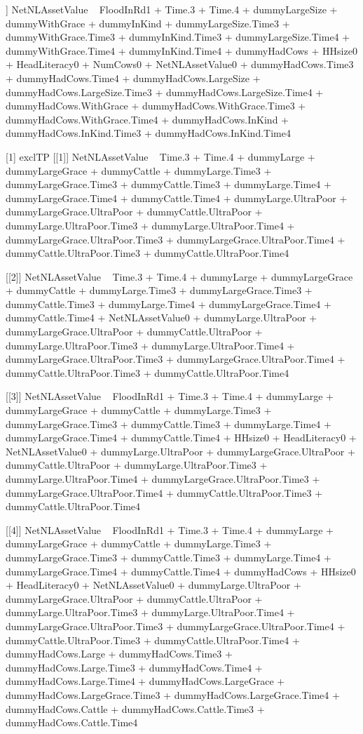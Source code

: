 \begin{Schunk}
\begin{Soutput}
[[6]]
NetNLAssetValue ~ FloodInRd1 + Time.3 + Time.4 + dummyLargeSize + 
    dummyWithGrace + dummyInKind + dummyLargeSize.Time3 + dummyWithGrace.Time3 + 
    dummyInKind.Time3 + dummyLargeSize.Time4 + dummyWithGrace.Time4 + 
    dummyInKind.Time4 + dummyHadCows + HHsize0 + HeadLiteracy0 + 
    NumCows0 + NetNLAssetValue0 + dummyHadCows.Time3 + dummyHadCows.Time4 + 
    dummyHadCows.LargeSize + dummyHadCows.LargeSize.Time3 + dummyHadCows.LargeSize.Time4 + 
    dummyHadCows.WithGrace + dummyHadCows.WithGrace.Time3 + dummyHadCows.WithGrace.Time4 + 
    dummyHadCows.InKind + dummyHadCows.InKind.Time3 + dummyHadCows.InKind.Time4

[1] exclTP
[[1]]
NetNLAssetValue ~ Time.3 + Time.4 + dummyLarge + dummyLargeGrace + 
    dummyCattle + dummyLarge.Time3 + dummyLargeGrace.Time3 + 
    dummyCattle.Time3 + dummyLarge.Time4 + dummyLargeGrace.Time4 + 
    dummyCattle.Time4 + dummyLarge.UltraPoor + dummyLargeGrace.UltraPoor + 
    dummyCattle.UltraPoor + dummyLarge.UltraPoor.Time3 + dummyLarge.UltraPoor.Time4 + 
    dummyLargeGrace.UltraPoor.Time3 + dummyLargeGrace.UltraPoor.Time4 + 
    dummyCattle.UltraPoor.Time3 + dummyCattle.UltraPoor.Time4

[[2]]
NetNLAssetValue ~ Time.3 + Time.4 + dummyLarge + dummyLargeGrace + 
    dummyCattle + dummyLarge.Time3 + dummyLargeGrace.Time3 + 
    dummyCattle.Time3 + dummyLarge.Time4 + dummyLargeGrace.Time4 + 
    dummyCattle.Time4 + NetNLAssetValue0 + dummyLarge.UltraPoor + 
    dummyLargeGrace.UltraPoor + dummyCattle.UltraPoor + dummyLarge.UltraPoor.Time3 + 
    dummyLarge.UltraPoor.Time4 + dummyLargeGrace.UltraPoor.Time3 + 
    dummyLargeGrace.UltraPoor.Time4 + dummyCattle.UltraPoor.Time3 + 
    dummyCattle.UltraPoor.Time4

[[3]]
NetNLAssetValue ~ FloodInRd1 + Time.3 + Time.4 + dummyLarge + 
    dummyLargeGrace + dummyCattle + dummyLarge.Time3 + dummyLargeGrace.Time3 + 
    dummyCattle.Time3 + dummyLarge.Time4 + dummyLargeGrace.Time4 + 
    dummyCattle.Time4 + HHsize0 + HeadLiteracy0 + NetNLAssetValue0 + 
    dummyLarge.UltraPoor + dummyLargeGrace.UltraPoor + dummyCattle.UltraPoor + 
    dummyLarge.UltraPoor.Time3 + dummyLarge.UltraPoor.Time4 + 
    dummyLargeGrace.UltraPoor.Time3 + dummyLargeGrace.UltraPoor.Time4 + 
    dummyCattle.UltraPoor.Time3 + dummyCattle.UltraPoor.Time4

[[4]]
NetNLAssetValue ~ FloodInRd1 + Time.3 + Time.4 + dummyLarge + 
    dummyLargeGrace + dummyCattle + dummyLarge.Time3 + dummyLargeGrace.Time3 + 
    dummyCattle.Time3 + dummyLarge.Time4 + dummyLargeGrace.Time4 + 
    dummyCattle.Time4 + dummyHadCows + HHsize0 + HeadLiteracy0 + 
    NetNLAssetValue0 + dummyLarge.UltraPoor + dummyLargeGrace.UltraPoor + 
    dummyCattle.UltraPoor + dummyLarge.UltraPoor.Time3 + dummyLarge.UltraPoor.Time4 + 
    dummyLargeGrace.UltraPoor.Time3 + dummyLargeGrace.UltraPoor.Time4 + 
    dummyCattle.UltraPoor.Time3 + dummyCattle.UltraPoor.Time4 + 
    dummyHadCows.Large + dummyHadCows.Time3 + dummyHadCows.Large.Time3 + 
    dummyHadCows.Time4 + dummyHadCows.Large.Time4 + dummyHadCows.LargeGrace + 
    dummyHadCows.LargeGrace.Time3 + dummyHadCows.LargeGrace.Time4 + 
    dummyHadCows.Cattle + dummyHadCows.Cattle.Time3 + dummyHadCows.Cattle.Time4


\end{Soutput}
\end{Schunk}
